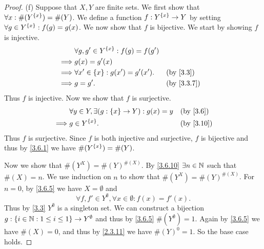 \begin{proof}{(f)}
  Suppose that \(X, Y\) are finite sets.
  We first show that \(\forall x : \#(Y^{\left\lbrace x\right\rbrace}) = \#(Y)\).
  We define a function \(f : Y^{\left\lbrace x\right\rbrace} \to Y\) by setting \(\forall g \in Y^{\left\lbrace x\right\rbrace} : f(g) = g(x)\).
  We now show that \(f\) is bijective.
  We start by showing \(f\) is injective.
  \begin{align*}
             & \forall g, g' \in Y^{\set{x}} : f(g) = f(g')                             \\
    \implies & g(x) = g'(x)                                                             \\
    \implies & \forall x' \in \set{x} : g(x') = g'(x').     &  & \text{(by \cref{3.3})} \\
    \implies & g = g'.                                      &  & \by{3.3.7}
  \end{align*}
  Thus \(f\) is injective.
  Now we show that \(f\) is surjective.
  \begin{align*}
             & \forall y \in Y, \exists (g : \set{x} \to Y) : g(x) = y &  & \text{(by \cref{3.6})}  \\
    \implies & g \in Y^{\set{x}}.                                      &  & \text{(by \cref{3.10})}
  \end{align*}
  Thus \(f\) is surjective.
  Since \(f\) is both injective and surjective, \(f\) is bijective and thus by \cref{3.6.1} we have \(\#(Y^{\left\lbrace x\right\rbrace}) = \#(Y)\).

  Now we show that \(\#(Y^X) = \#(Y)^{\#(X)}\).
  By \cref{3.6.10} \(\exists n \in \mathbb{N}\) such that \(\#(X) = n\).
  We use induction on \(n\) to show that \(\#(Y^X) = \#(Y)^{\#(X)}\).
  For \(n = 0\), by \cref{3.6.5} we have \(X = \emptyset\) and
  \[
    \forall f, f' \in Y^\emptyset, \forall x \in \emptyset : f(x) = f'(x).
  \]
  Thus by \cref{3.3} \(Y^\emptyset\) is a singleton set.
  We can construct a bijection \(g : \left\lbrace i \in \mathbb{N} : 1 \leq i \leq 1\right\rbrace \to Y^\emptyset\) and thus by \cref{3.6.5} \(\#(Y^\emptyset) = 1\).
  Again by \cref{3.6.5} we have \(\#(X) = 0\), and thus by \cref{2.3.11} we have \(\#(Y)^0 = 1\).
  So the base case holds.


\end{proof}
